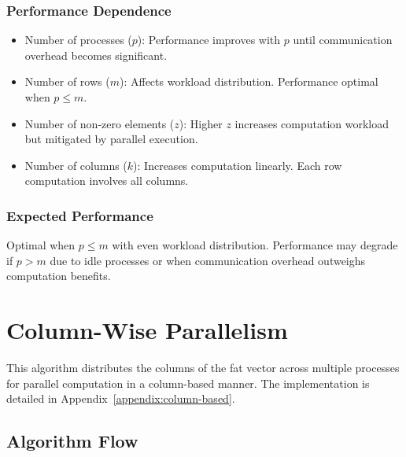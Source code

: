 \documentclass[12pt,oneside]{book} %
\begin{document}
\subsubsection{Performance Dependence}
\begin{itemize}
    \item Number of processes ($p$): Performance improves with $p$ until communication
          overhead becomes significant.
    \item Number of rows ($m$): Affects workload distribution. Performance optimal when
          $p \leq m$.
    \item Number of non-zero elements ($z$): Higher $z$ increases computation workload
          but mitigated by parallel execution.
    \item Number of columns ($k$): Increases computation linearly. Each row computation
          involves all columns.
\end{itemize}

\subsubsection{Expected Performance}
Optimal when $p \leq m$ with even workload distribution. Performance may
degrade if $p > m$ due to idle processes or when communication overhead
outweighs computation benefits.

\newpage
\section{Column-Wise Parallelism}
This algorithm distributes the columns of the fat vector across multiple
processes for parallel computation in a column-based manner. The implementation
is detailed in Appendix~\ref{appendix:column-based}.

\subsection{Algorithm Flow}
\end{document}
